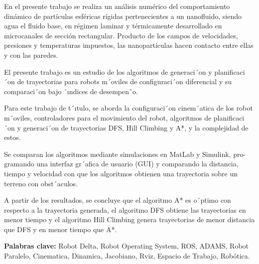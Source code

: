\thispagestyle{fancy}
\vspace{5mm}
En el presente trabajo se realiza un análisis numérico del comportamiento dinámico de partículas esféricas rígidas pertenecientes a un nanofluido, siendo agua el fluido base, en régimen laminar y térmicamente desarrollado en microcanales de sección rectangular. Producto de los campos de velocidades, presiones y temperaturas impuestos, las nanopartículas hacen contacto entre ellas y con las paredes.

El presente trabajo es un estudio de los algoritmos de generaci´on y planificaci´on de  trayectorias  para  robots  m´oviles  de  configuraci´on  diferencial  y  su  comparaci´on bajo ´ındices de desempen˜o.

Para  este  trabajo  de  t´ıtulo,  se  aborda  la  configuraci´on  cinem´atica  de  los  robot m´oviles,  controladores  para  el  movimiento  del  robot,  algoritmos  de  planificaci´on  y generaci´on de trayectorias DFS, Hill Climbing y A*, y la complejidad de estos.

Se comparan los algoritmos mediante simulaciones en MatLab y Simulink, pro- gramando una interfaz gr´afica de usuario (GUI) y comparando la distancia, tiempo y velocidad con que los algoritmos obtienen una trayectoria sobre un terreno con obst´aculos.

A partir de los resultados, se concluye que el algoritmo A* es o´ptimo con respecto a la trayectoria generada, el algoritmo DFS obtiene las trayectorias en menor tiempo y el algoritmo Hill Climbing genera trayectorias de menor distancia que DFS y en menor tiempo que A*.


\vfill
\noindent\textbf{Palabras clave:} Robot Delta, Robot Operating System, ROS, ADAMS, Robot Paralelo, Cinematica, Dinamica, Jacobiano, Rviz, Espacio de Trabajo, Robótica.
